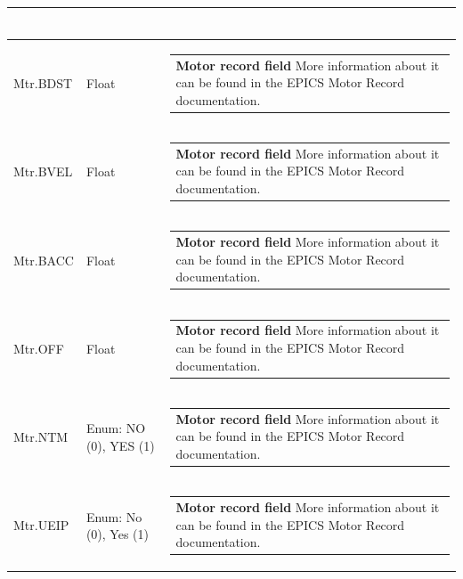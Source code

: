 \documentclass[openany]{article}
\begin{document}
\begin{longtable}{| m{4.5cm} m{2.5cm}  m{8.5cm} |}
\begin{tabular}{@{}m{6cm}@{}}
            \end{tabular} \hypertarget{pv:mtr-bdst}{}\\ \hline
        Mtr.BDST & Float & \begin{tabular}{@{}m{6cm}@{}}
                \textbf{\color{ForestGreen} Motor record field} More information about it can be found in the EPICS Motor Record documentation.
            \end{tabular} \hypertarget{pv:mtr-bvel}{}\\ \hline
        Mtr.BVEL & Float & \begin{tabular}{@{}m{6cm}@{}}
                \textbf{\color{ForestGreen} Motor record field} More information about it can be found in the EPICS Motor Record documentation.
            \end{tabular} \hypertarget{pv:mtr-bacc}{}\\ \hline
        Mtr.BACC & Float & \begin{tabular}{@{}m{6cm}@{}}
                \textbf{\color{ForestGreen} Motor record field} More information about it can be found in the EPICS Motor Record documentation.
            \end{tabular} \hypertarget{pv:mtr-off}{}\\ \hline
        Mtr.OFF & Float & \begin{tabular}{@{}m{6cm}@{}}
                \textbf{\color{ForestGreen} Motor record field} More information about it can be found in the EPICS Motor Record documentation.
            \end{tabular} \hypertarget{pv:mtr-ntm}{}\\ \hline
        Mtr.NTM & Enum: NO (0), YES (1) & \begin{tabular}{@{}m{6cm}@{}}
                \textbf{\color{ForestGreen} Motor record field} More information about it can be found in the EPICS Motor Record documentation.
            \end{tabular} \hypertarget{pv:mtr-ueip}{}\\ \hline
        Mtr.UEIP & Enum: No (0), Yes (1) & \begin{tabular}{@{}m{6cm}@{}}
                \textbf{\color{ForestGreen} Motor record field} More information about it can be found in the EPICS Motor Record documentation.
            \end{tabular} \hypertarget{pv:mtr-rtry}{}\\ \hline

\end{longtable}
\end{document}
